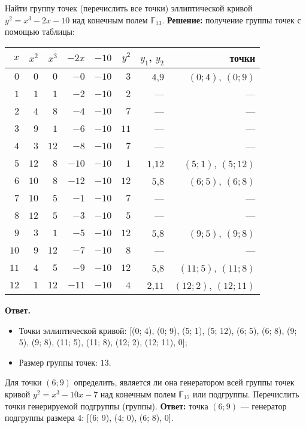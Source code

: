 \tasknumber Найти группу точек (перечислить все точки) эллиптической кривой $y^2 = x^3 - 2 x - 10$ над конечным полем $\mathbb{F}_{13}$.
\medbreak
\textbf{Решение:} получение группы точек с помощью таблицы:\\
\begin{tabular}{|r|r|r|r|r|r|r|r|}
\hline
$x$ & $x^2$ & $x^3$ & $-2x$ & $-10$ & $y^2$ & $y_1$, $y_2$ & точки \\ 
\hline
$0$ & $0$ & $0$ & $-0$ & $-10$ & $3$ & $4$,$9$ &$(0; 4)$, $(0; 9)$ \\ 
$1$ & $1$ & $1$ & $-2$ & $-10$ & $2$ &  --- & --- \\ 
$2$ & $4$ & $8$ & $-4$ & $-10$ & $7$ &  --- & --- \\ 
$3$ & $9$ & $1$ & $-6$ & $-10$ & $11$ &  --- & --- \\ 
$4$ & $3$ & $12$ & $-8$ & $-10$ & $7$ &  --- & --- \\ 
$5$ & $12$ & $8$ & $-10$ & $-10$ & $1$ & $1$,$12$ &$(5; 1)$, $(5; 12)$ \\ 
$6$ & $10$ & $8$ & $-12$ & $-10$ & $12$ & $5$,$8$ &$(6; 5)$, $(6; 8)$ \\ 
$7$ & $10$ & $5$ & $-1$ & $-10$ & $7$ &  --- & --- \\ 
$8$ & $12$ & $5$ & $-3$ & $-10$ & $5$ &  --- & --- \\ 
$9$ & $3$ & $1$ & $-5$ & $-10$ & $12$ & $5$,$8$ &$(9; 5)$, $(9; 8)$ \\ 
$10$ & $9$ & $12$ & $-7$ & $-10$ & $8$ &  --- & --- \\ 
$11$ & $4$ & $5$ & $-9$ & $-10$ & $12$ & $5$,$8$ &$(11; 5)$, $(11; 8)$ \\ 
$12$ & $1$ & $12$ & $-11$ & $-10$ & $4$ & $2$,$11$ &$(12; 2)$, $(12; 11)$ \\ 
\hline
\end{tabular}
\medbreak
\textbf{Ответ.}
\begin{itemize}
\item Точки эллиптической кривой: [(0; 4), (0; 9), (5; 1), (5; 12), (6; 5), (6; 8), (9; 5), (9; 8), (11; 5), (11; 8), (12; 2), (12; 11), 0];
\item Размер группы точек: $13$.
\end{itemize}
\bigbreak

\tasknumber Для точки $\left(6; 9\right)$ определить, является ли она генератором всей группы точек кривой $y^2 = x^3 - 10 x - 7$ над конечным полем $\mathbb{F}_{17}$ или подгруппы. Перечислить точки генерируемой подгруппы (группы).
\medbreak
\textbf{Ответ:} точка $\left(6; 9\right)$ — генератор подгруппы размера 4: [(6; 9), (4; 0), (6; 8), 0].
\bigbreak

